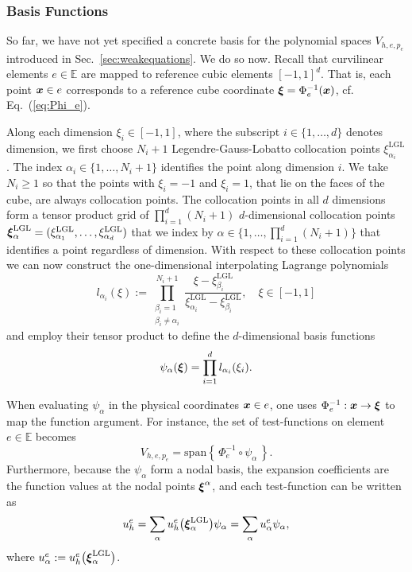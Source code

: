 \subsubsection{Basis Functions}

So far, we have not yet specified a concrete basis for the polynomial spaces $V_{h,e,p_e}$ introduced in Sec.~\ref{sec:weakequations}. We do so now.
Recall that curvilinear elements $e \in \mathbb{E}$ are mapped to reference
cubic elements $[-1,1]^d$.
That is, each point $\boldsymbol{x}\in e$ corresponds to a reference cube coordinate $\boldsymbol{\xi} =\Phi_e^{-1}(\boldsymbol{x})$, cf. Eq.~(\ref{eq:Phi_e}).

Along each dimension $\xi_i\in[-1,1]$, where the subscript
  $i\in\{1,\ldots,d\}$ denotes dimension, we first choose
$N_i + 1$ Legendre-Gauss-Lobatto collocation points
  $\xi^\mathrm{LGL}_{\alpha_i}$. The index
  $\alpha_i\in\{1,\ldots,N_i+1\}$ identifies the point along dimension
  $i$. We take $N_i\geq 1$ so that the points with $\xi_i=-1$ and
  $\xi_i=1$, that lie on the faces of the cube, are always collocation
  points. The collocation points in all $d$ dimensions form a tensor
  product grid of $\prod_{i=1}^d (N_i + 1)$ $d$-dimensional
  collocation points
  $\boldsymbol{\xi}^\mathrm{LGL}_\alpha=(\xi^\mathrm{LGL}_{\alpha_1},\ldots,\xi^\mathrm{LGL}_{\alpha_d})$
  that we index by $\alpha\in\{1,\ldots,\prod_{i=1}^d (N_i + 1)\}$
  that identifies a point regardless of dimension. With respect to
  these collocation points we can now construct the one-dimensional
  interpolating Lagrange polynomials
\begin{equation}
  l_{\alpha_i}(\xi) := \prod_{\substack{\beta_i=1\\\beta_i\neq\alpha_i}}^{N_i+1} \frac{\xi-\xi^\mathrm{LGL}_{\beta_i}}{\xi^\mathrm{LGL}_{\alpha_i} - \xi^\mathrm{LGL}_{\beta_i}}, \quad \xi\in[-1,1]
\end{equation}
and employ their tensor product to define the $d$-dimensional basis functions
\begin{equation}
\label{eq:Lagrange_Basis}
\psi_\alpha(\boldsymbol{\xi}) = \prod_{i=1}^d l_{\alpha_i}(\xi_i) \text{.}
\end{equation}

    When evaluating $\psi_\alpha$ in the physical coordinates $\boldsymbol{x}\in e$, one uses $\Phi_e^{-1}:\boldsymbol{x}\to \boldsymbol{\xi}$ to map the function argument. For instance, the set of test-functions on element $e\in \mathbb{E}$ becomes
  \begin{equation}
  V_{h,e,p_e}=\mbox{span}\left\{\,\Phi_e^{-1}\circ\psi_\alpha\,\right\}.
  \end{equation}
  Furthermore, because the $\psi_\alpha$ form a nodal basis, the expansion coefficients are the function values at the nodal points $\boldsymbol{\xi}^\alpha$, and each test-function can be written as
  \begin{equation}
    u^e_h = \sum_{\alpha}u^e_h\big(\boldsymbol{\xi}_\alpha^{\textrm{LGL}}\big)\psi_\alpha = \sum_{\alpha}u^e_\alpha\psi_\alpha,
    \end{equation}
where $u^e_\alpha:= u^e_h\big(\boldsymbol{\xi}_\alpha^{\textrm{LGL}}\big)$.
